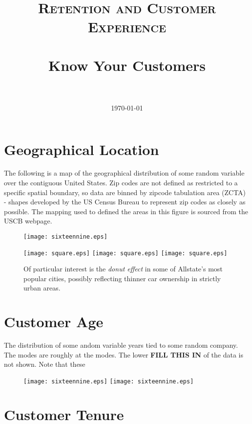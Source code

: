 \documentclass[paper=a4, fontsize=11pt]{scrartcl} %
\title{	
\normalfont \normalsize 
\textsc{Retention and Customer Experience} \\ [25pt] %
\horrule{0.5pt} \\[0.4cm] %
\huge Know Your Customers \\ %
\horrule{2pt} \\[0.5cm] %
}
\date{\normalsize\today} %
\numberwithin{equation}{section} %
\numberwithin{figure}{section} %
\numberwithin{table}{section} %
\begin{document}
\maketitle %

\newpage

\section{Geographical Location}
The following is a map of the geographical distribution of some random variable over the contiguous United States. Zip codes are not defined as restricted to a specific spatial boundary, so data are binned by zipcode tabulation area (ZCTA) - shapes developed by the US Census Bureau to represent zip codes as closely as possible. The mapping used to defined the areas in this figure is sourced from the USCB webpage.  

\begin{figure}[h!]
\centering
\texttt{[image: sixteennine.eps]}
\end{figure}

\begin{figure}[ht!]
\centering
\centering
\texttt{[image: square.eps]}\hfill
\texttt{[image: square.eps]}\hfill
\texttt{[image: square.eps]}
\caption{Of particular interest is the \textit{donut effect} in some of Allstate's most popular cities, possibly reflecting thinner car ownership in strictly urban areas.}
\end{figure}

\section{Customer Age}
The distribution of some andom variable years tied to some random company. The modes are roughly at the modes. The lower \textbf{FILL THIS IN} of the data is not shown. Note that these 

\begin{figure}[h!]
\centering
\texttt{[image: sixteennine.eps]}
\texttt{[image: sixteennine.eps]}
\end{figure}

\section{Customer Tenure}

  


\end{document}
